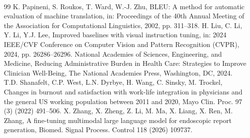 ﻿﻿\documentclass[12pt]{report}
\begin{document}
\begin{thebibliography}{99}
 K. Papineni, S. Roukos, T. Ward, W.-J. Zhu, BLEU: A method for automatic evaluation of machine translation, in: Proceedings of the 40th Annual Meeting of the Association for Computational Linguistics, 2002, pp. 311--318.
 H. Liu, C. Li, Y. Li, Y.J. Lee, Improved baselines with visual instruction tuning, in: 2024 IEEE/CVF Conference on Computer Vision and Pattern Recognition (CVPR), 2024, pp. 26286--26296.
 {National Academies of Sciences, Engineering, and Medicine}, Reducing Administrative Burden in Health Care: Strategies to Improve Clinician Well-Being, The National Academies Press, Washington, DC, 2024.
 T.D. Shanafelt, C.P. West, L.N. Dyrbye, H. Wang, C. Sinsky, M. Trockel, Changes in burnout and satisfaction with work-life integration in physicians and the general US working population between 2011 and 2020, Mayo Clin. Proc. 97 (3) (2022) 491--506.
 X. Zhang, X. Zheng, Z. Li, M. Ma, X. Liang, X. Ren, M. Zhang, A fine-tuning multimodal large language model for endoscopic report generation, Biomed. Signal Process. Control 118 (2026) 109737.
\end{thebibliography}
\end{document}

